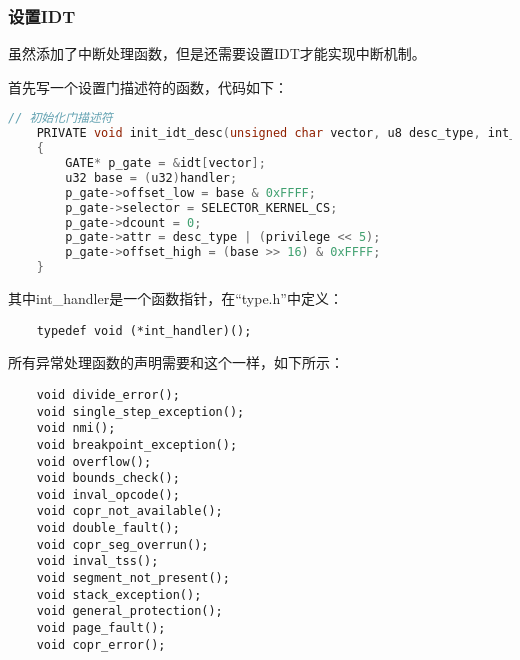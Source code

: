 \documentclass[a4paper,left=2.5cm,right=2.5cm,11pt]{article}
\begin{document}
\subsubsection{设置IDT}
	虽然添加了中断处理函数，但是还需要设置IDT才能实现中断机制。\par
	首先写一个设置门描述符的函数，代码如下：
	\begin{lstlisting}[language = C]
	// 初始化门描述符
	PRIVATE void init_idt_desc(unsigned char vector, u8 desc_type, int_handler handler, unsigned char privilege)
	{
		GATE* p_gate = &idt[vector];
		u32 base = (u32)handler;
		p_gate->offset_low = base & 0xFFFF;
		p_gate->selector = SELECTOR_KERNEL_CS;
		p_gate->dcount = 0;
		p_gate->attr = desc_type | (privilege << 5);
		p_gate->offset_high = (base >> 16) & 0xFFFF;
	}
	\end{lstlisting}

	其中int\_handler是一个函数指针，在“type.h”中定义：
	\begin{lstlisting}
	typedef void (*int_handler)();
	\end{lstlisting}

	所有异常处理函数的声明需要和这个一样，如下所示：
	\begin{lstlisting}
	void divide_error();
	void single_step_exception();
	void nmi();
	void breakpoint_exception();
	void overflow();
	void bounds_check();
	void inval_opcode();
	void copr_not_available();
	void double_fault();
	void copr_seg_overrun();
	void inval_tss();
	void segment_not_present();
	void stack_exception();
	void general_protection();
	void page_fault();
	void copr_error();
	\end{lstlisting}
\end{document}

